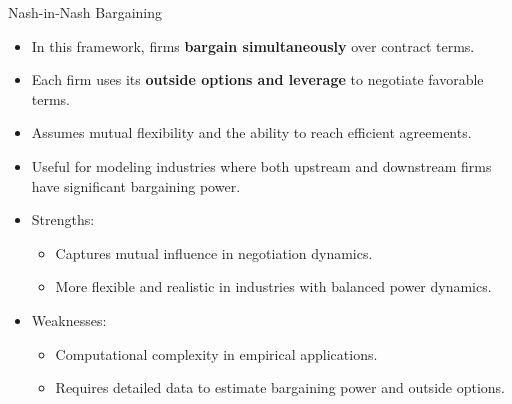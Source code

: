 \documentclass[aspectratio=169]{beamer}  %
\begin{document}
\begin{frame}{Nash-in-Nash Bargaining}
    \begin{itemize}
        \item In this framework, firms \textbf{bargain simultaneously} over contract terms.
        \item Each firm uses its \textbf{outside options and leverage} to negotiate favorable terms.
        \item Assumes mutual flexibility and the ability to reach efficient agreements.
        \item Useful for modeling industries where both upstream and downstream firms have significant bargaining power.
        \item Strengths:
        \begin{itemize}
            \item Captures mutual influence in negotiation dynamics.
            \item More flexible and realistic in industries with balanced power dynamics.
        \end{itemize}
        \item Weaknesses:
        \begin{itemize}
            \item Computational complexity in empirical applications.
            \item Requires detailed data to estimate bargaining power and outside options.
        \end{itemize}
    \end{itemize}
    \end{frame}
   
\end{document}
